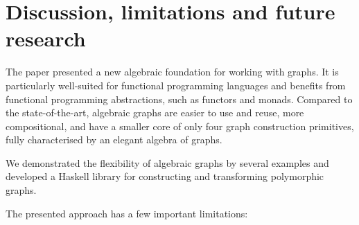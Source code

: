 \vspace{-1mm}
\section{Discussion, limitations and future research}\label{sec-discussion}

The paper presented a new algebraic foundation for working with graphs.
It is particularly well-suited for functional programming languages
and benefits from functional programming abstractions, such as functors and
monads. Compared to the state-of-the-art, algebraic graphs are easier to use and reuse,
more compositional, and have a smaller core of only four graph
construction primitives, fully characterised by an elegant algebra of graphs.

We demonstrated the flexibility of algebraic graphs by several examples and
developed a Haskell library for constructing and transforming polymorphic graphs.

The presented approach has a few important limitations:

